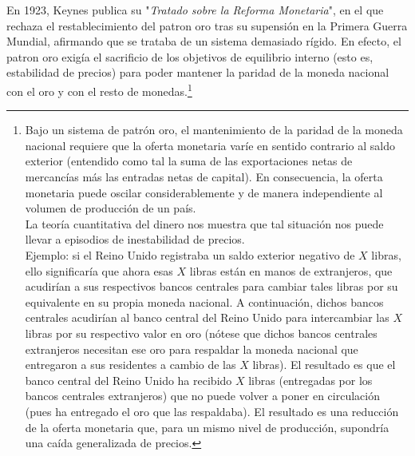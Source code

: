 \documentclass[10pt,a4paper]{article}
\begin{document}
En 1923, Keynes publica su "\textit{Tratado sobre la Reforma Monetaria}", en el que rechaza el restablecimiento del patron oro tras su supensión en la Primera Guerra Mundial, afirmando que se trataba de un sistema demasiado rígido. En efecto, el patron oro exigía el sacrificio de los objetivos de equilibrio interno (esto es, estabilidad de precios) para poder mantener la paridad de la moneda nacional con el oro y con el resto de monedas.\footnote{%
    Bajo un sistema de patrón oro, el mantenimiento de la paridad de la moneda nacional requiere que la oferta monetaria varíe en sentido contrario al saldo exterior (entendido como tal la suma de las exportaciones netas de mercancías más las entradas netas de capital). En consecuencia, la oferta monetaria puede oscilar considerablemente y de manera independiente al volumen de producción de un país.\\
La teoría cuantitativa del dinero nos muestra que tal situación nos puede llevar a episodios de inestabilidad de precios.\\
Ejemplo: si el Reino Unido registraba un saldo exterior negativo de $X$ libras, ello significaría que ahora esas $X$ libras están en manos de extranjeros, que acudirían a sus respectivos bancos centrales para cambiar tales libras por su equivalente en su propia moneda nacional. A continuación, dichos bancos centrales acudirían al banco central del Reino Unido para intercambiar las $X$ libras por su respectivo valor en oro (nótese que dichos bancos centrales extranjeros necesitan ese oro para respaldar la moneda nacional que entregaron a sus residentes a cambio de las $X$ libras). El resultado es que el banco central del Reino Unido ha recibido $X$ libras (entregadas por los bancos centrales extranjeros) que no puede volver a poner en circulación (pues ha entregado el oro que las respaldaba). El resultado es una reducción de la oferta monetaria que, para un mismo nivel de producción, supondría una caída generalizada de precios.
}
\end{document}
